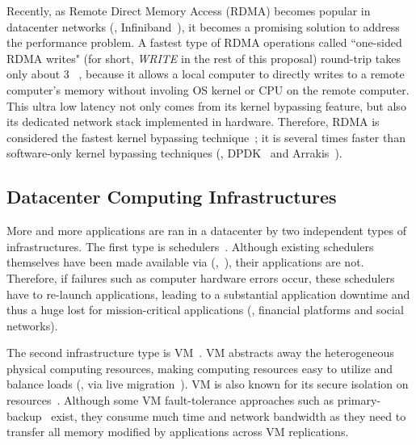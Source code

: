 Recently, as Remote Direct Memory Access (RDMA) becomes popular in datacenter 
networks (\eg, Infiniband~\cite{infiniband}), it becomes a promising solution 
to address the \paxos performance problem. A fastest type of RDMA operations 
called ``one-sided RDMA writes" (for short, \emph{WRITE} in the rest of this 
proposal) round-trip takes only about 3 \us~\cite{pilaf:usenix14}, because it 
allows a local computer to directly writes to a remote computer's memory 
without involing OS kernel or CPU on the remote computer. This ultra low latency 
not only comes from its kernel bypassing feature, but also its dedicated 
network stack implemented in hardware. Therefore, RDMA is considered the fastest 
kernel bypassing technique~\cite{herd:sigcomm14,pilaf:usenix14,dare:hpdc15}; it 
is several times faster than software-only kernel bypassing techniques (\eg, 
DPDK~\cite{dpdk} and Arrakis~\cite{arrakis:osdi14}).

\vspace{-.15in}\subsection{Datacenter Computing Infrastructures}
\label{sec:datacenter}\vspace{-.075in}

More and more applications are ran in a datacenter by two 
independent types of infrastructures. The first type is 
schedulers~\cite{borg:eurosys15,mesos:nsdi11,tupperware, yarn:socc13, 
autopilot:sosp07,quincy:sosp09,apollo:osdi14,fuxi:vldb14}. Although existing 
schedulers themselves have been made available via \paxos 
(\eg,~\cite{mesos:nsdi11}), their applications are not. Therefore, if failures 
such as computer hardware errors occur, these schedulers have to re-launch 
applications, leading to a substantial application downtime and thus a 
huge lost for mission-critical applications (\eg, financial platforms and social 
networks).

The second infrastructure type is VM~\cite{amazon:vpc, openstack, esx:osdi02, 
kvm, xen:sosp}. VM abstracts away the heterogeneous physical computing 
resources, making computing resources easy to utilize and balance loads (\eg, 
via live migration~\cite{vmotion:atc05,xen:migration:nsdi05}). VM is also known 
for its secure isolation on resources~\cite{xen:sosp,kvm,vmware:sugerman}. 
Although some VM fault-tolerance approaches such 
as primary-backup~\cite{remus:nsdi08,ftvm} exist, they consume much 
time and network bandwidth as they need to transfer all memory modified by 
applications across VM replications.

